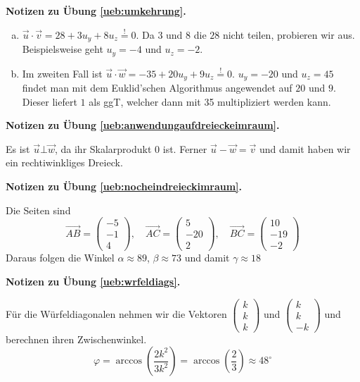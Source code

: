 \documentclass[%
11pt,%
twoside,%
titlepage,%
german,%
headsepline%
]{scrartcl}
\theoremstyle{definition}
\theoremstyle{plain}
\newcommand{\concatueb}[1]{ueb:#1}%
\newcommand{\concatlsg}[1]{lsg:#1}%
\newenvironment{lsg}[1]{%
    \par\noindent\textbf{Notizen zu Übung \ref{\concatueb{#1}}.}%
    \label{\concatlsg{#1}}
}{%
    \par%
}
\begin{document}
\begin{lsg}{umkehrung}
\begin{enumerate}[a)]
    \item $\vec{u}\cdot\vec{v}=28+3u_y+8u_z\stackrel{!}{=}0$. Da $3$ und $8$ die $28$ nicht teilen, probieren wir aus. Beispielsweise geht $u_y=-4$ und $u_z=-2$.
    \item Im zweiten Fall ist $\vec{u}\cdot\vec{w}=-35+20u_y+9u_z\stackrel{!}{=}0$. $u_y=-20$ und $u_z=45$ findet man mit dem Euklid'schen Algorithmus angewendet auf $20$ und $9$. Dieser liefert $1$ als ggT, welcher dann mit 35 multipliziert werden kann.
\end{enumerate}
\end{lsg}
\begin{lsg}{anwendungaufdreieckeimraum}
Es ist $\vec{u}\bot\vec{w}$, da ihr Skalarprodukt $0$ ist. Ferner $\vec{u}-\vec{w}=\vec{v}$ und damit haben wir ein rechtiwinkliges Dreieck.
\end{lsg}
\begin{lsg}{nocheindreieckimraum}
Die Seiten sind
$$\vec{AB}=\begin{pmatrix}
    -5\\-1\\4
\end{pmatrix},\quad \vec{AC}=\begin{pmatrix}
    5\\-20\\2
\end{pmatrix},\quad \vec{BC}=\begin{pmatrix}
    10\\-19\\-2
\end{pmatrix}$$
Daraus folgen die Winkel $\alpha\approx89$, $\beta\approx73$ und damit $\gamma\approx18$
\end{lsg}
\begin{lsg}{wrfeldiags}
Für die Würfeldiagonalen nehmen wir die Vektoren $\begin{pmatrix}
    k\\k\\k
\end{pmatrix}$ und $\begin{pmatrix}
    k\\k\\-k
\end{pmatrix}$
und berechnen ihren Zwischenwinkel.
$$\varphi=\arccos\left(\frac{2k^2}{3k^2}\right)=\arccos\left(\frac{2}{3}\right)\approx48^\circ$$
\end{lsg}
\end{document}
